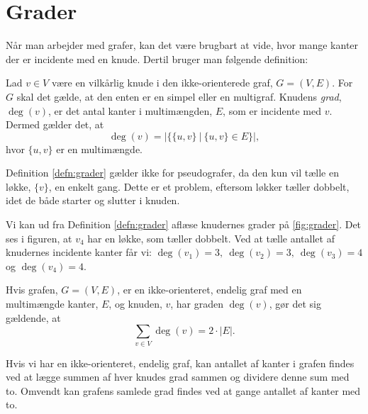 \section{Grader} \label{sec:grader}
Når man arbejder med grafer, kan det være brugbart at vide, hvor mange kanter der er incidente med en knude. Dertil bruger man følgende definition:

\begin{defn}[Grader] \label{defn:grader}
Lad $v \in V$ være en vilkårlig knude i den ikke-orienterede graf, $G = (V,E)$. For $G$ skal det gælde, at den enten er en simpel eller en multigraf. Knudens \emph{grad}, $\deg(v)$, er det antal kanter i multimængden, $E$, som er incidente med $v$. Dermed gælder det, at
\begin{equation}
\deg(v)=|\{ \{u,v\} \ | \ \{u,v\}\in E \}|,
\end{equation}
hvor $\{u,v\}$ er en multimængde.
\end{defn}

Definition \ref{defn:grader} gælder ikke for pseudografer, da den kun vil tælle en løkke, $\{v\}$, en enkelt gang. Dette er et problem, eftersom løkker tæller dobbelt, idet de både starter og slutter i knuden.

\begin{exmp} \label{ex:grader}

Vi kan ud fra Definition \ref{defn:grader} aflæse knudernes grader på \autoref{fig:grader}. Det ses i figuren, at $v_4$ har en løkke, som tæller dobbelt. Ved at tælle antallet af knudernes incidente kanter får vi: $\deg(v_{1})=3, \ \deg(v_{2})=3, \ \deg(v_{3})=4$ og $\deg(v_{4})=4$.


\end{exmp}

\begin{thm}
Hvis grafen, $G = (V,E)$, er en ikke-orienteret, endelig graf med en multimængde kanter, $E$, og knuden, $v$, har graden $\deg(v)$, gør det sig gældende, at
\begin{equation} \label{eq:degv=2e}
	\sum_{v \in V} { } \deg(v) = 2 \cdot |E|.
\end{equation}
\end{thm}

Hvis vi har en ikke-orienteret, endelig graf, kan antallet af kanter i grafen findes ved at lægge summen af hver knudes grad sammen og dividere denne sum med to. Omvendt kan grafens samlede grad findes ved at gange antallet af kanter med to.

